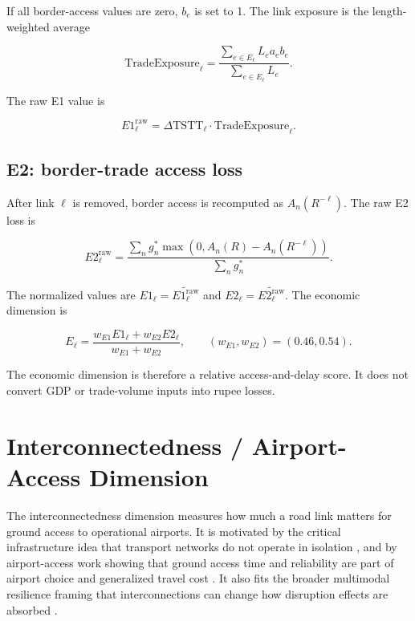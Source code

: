 \documentclass[11pt,a4paper]{article}
\begin{document}
If all border-access values are zero, $b_e$ is set to 1. The link exposure is
the length-weighted average

\begin{equation}
\mathrm{TradeExposure}_{\ell}
=
\frac{\sum_{e\in E_{\ell}}L_e a_e b_e}
     {\sum_{e\in E_{\ell}}L_e}.
\label{eq:mlpi-trade-exposure}
\end{equation}

The raw E1 value is

\begin{equation}
E1^{\mathrm{raw}}_{\ell}
=\Delta \mathrm{TSTT}_{\ell}
\cdot
\mathrm{TradeExposure}_{\ell}.
\label{eq:mlpi-e1-raw}
\end{equation}

\subsection{E2: border-trade access loss}

After link $\ell$ is removed, border access is recomputed as
$A_n(R^{-\ell})$. The raw E2 loss is

\begin{equation}
E2^{\mathrm{raw}}_{\ell}
=
\frac{
\sum_n g^{*}_n \max(0,A_n(R)-A_n(R^{-\ell}))
}{
\sum_n g^{*}_n
}.
\label{eq:mlpi-e2-raw}
\end{equation}

The normalized values are $E1_{\ell}=\widetilde{E1^{\mathrm{raw}}_{\ell}}$
and $E2_{\ell}=\widetilde{E2^{\mathrm{raw}}_{\ell}}$. The economic dimension
is

\begin{equation}
E_{\ell}
=\frac{w_{E1}E1_{\ell}+w_{E2}E2_{\ell}}
        {w_{E1}+w_{E2}},
\qquad
(w_{E1},w_{E2})=(0.46,0.54).
\label{eq:mlpi-economic}
\end{equation}

The economic dimension is therefore a relative access-and-delay score. It does
not convert GDP or trade-volume inputs into rupee losses.

\section{Interconnectedness / Airport-Access Dimension}

The interconnectedness dimension measures how much a road link matters for
ground access to operational airports. It is motivated by the critical
infrastructure idea that transport networks do not operate in isolation
\cite{thacker2017}, and by airport-access work showing that ground access time
and reliability are part of airport choice and generalized travel cost
\cite{kouwenhoven2008,koster2011}. It also fits the broader multimodal
resilience framing that interconnections can change how disruption effects are
absorbed \cite{xu2023}.
\end{document}
